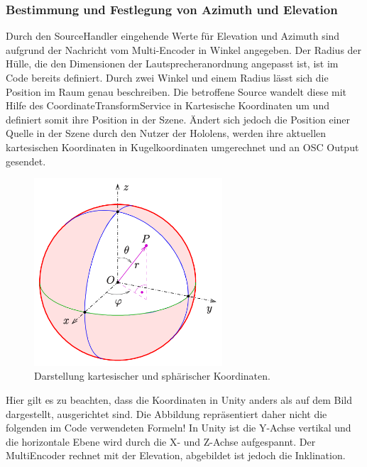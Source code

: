 \documentclass[11pt, titlepage, fleqn]{report}
\begin{document}
                \subsubsection{Bestimmung und Festlegung von Azimuth und Elevation}
                    Durch den SourceHandler eingehende Werte für Elevation und Azimuth sind aufgrund der Nachricht vom Multi-Encoder 
                    in Winkel angegeben. Der Radius der Hülle, die den Dimensionen der Lautsprecheranordnung angepasst ist, ist im Code 
                    bereits definiert. Durch zwei Winkel und einem Radius lässt sich die Position im Raum genau beschreiben. 
                    Die betroffene Source wandelt diese mit Hilfe des CoordinateTransformService in Kartesische Koordinaten um und 
                    definiert somit ihre Position in der Szene. Ändert sich jedoch die Position einer Quelle in der Szene durch den Nutzer der Hololens, werden ihre aktuellen 
                    kartesischen Koordinaten in Kugelkoordinaten umgerechnet und an OSC Output gesendet.\newline
                    \begin{figure}
                        \includegraphics[width=7cm]{./img/kugel.png}
                        \caption{ Darstellung kartesischer und sphärischer Koordinaten.
                        \label{fig:kugel}}
                    \end{figure}
                    Hier gilt es zu beachten, dass die Koordinaten in Unity anders als auf dem Bild dargestellt, ausgerichtet sind.
                    Die Abbildung repräsentiert daher nicht die folgenden im Code verwendeten Formeln!
                    In Unity ist die Y-Achse vertikal und die horizontale Ebene wird durch die X- und Z-Achse aufgespannt.
                    Der MultiEncoder rechnet mit der Elevation, abgebildet ist jedoch die Inklination.\newline\newline
\end{document}
